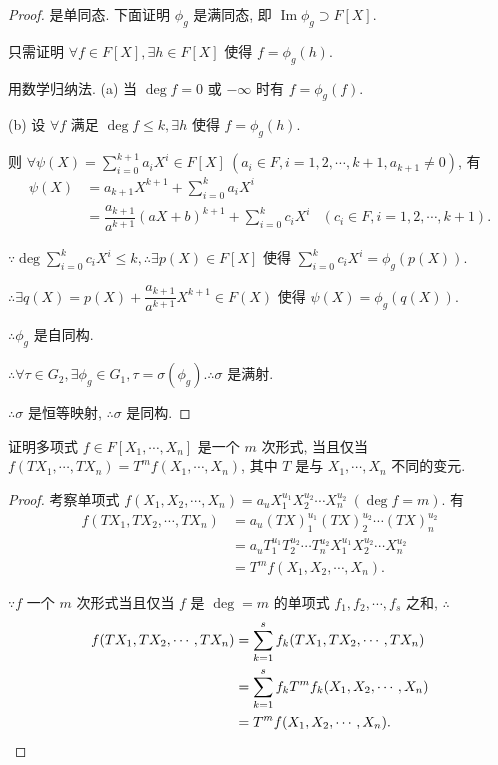 \documentclass[UTF8]{ctexart}
\begin{document}
\begin{proof}
    是单同态. 下面证明 $\phi_g$ 是满同态, 即 $\operatorname{Im}\phi_g\supset F[X]$.

    只需证明 $\forall f\in F[X],\exists h\in F[X]$ 使得 $f=\phi_g(h)$.

    用数学归纳法. (a) 当 $\deg f=0$ 或 $-\infty$ 时有 $f=\phi_g(f)$.

    (b) 设 $\forall f$ 满足 $\deg f\leq k,\exists h$ 使得 $f=\phi_g(h)$.

    则 $\forall\psi(X)=\sum\limits_{i=0}^{k+1}a_iX^i\in F[X]\ (a_i\in F,i=1,2,\cdots,k+1,a_{k+1}\neq0)$, 有
    \begin{align*}
        \psi(X) & =a_{k+1}X^{k+1}+\sum\limits_{i=0}^{k}a_iX^i \\
        & =\dfrac{a_{k+1}}{a^{k+1}}(aX+b)^{k+1}+\sum\limits_{i=0}^{k}c_iX^i & (c_i\in F,i=1,2,\cdots,k+1).
    \end{align*}

    $\because\deg\sum\limits_{i=0}^{k}c_iX^i\leq k,\therefore\exists p(X)\in F[X]$ 使得 $\sum\limits_{i=0}^{k}c_iX^i=\phi_g(p(X))$.

    $\therefore\exists q(X)=p(X)+\dfrac{a_{k+1}}{a^{k+1}}X^{k+1}\in F(X)$ 使得 $\psi(X)=\phi_g(q(X))$.

    $\therefore\phi_g$ 是自同构.

    $\therefore\forall\tau\in G_2,\exists\phi_g\in G_1,\tau=\sigma(\phi_g).\therefore\sigma$ 是满射.

    $\therefore\sigma$ 是恒等映射, $\therefore\sigma$ 是同构.
\end{proof}
\begin{exercise}
    证明多项式 $f\in F[X_1,\cdots,X_n]$ 是一个 $m$ 次形式, 当且仅当 $f(TX_1,\cdots,TX_n)=T^mf(X_1,\cdots,X_n)$, 其中 $T$ 是与 $X_1,\cdots,X_n$ 不同的变元.
\end{exercise}
\begin{proof}
    考察单项式 $f(X_1,X_2,\cdots,X_n)=a_uX^{u_1}_1X^{u_2}_2\cdots X^{u_2}_n\ (\deg f=m)$. 有
    \begin{align*}
        f(TX_1,TX_2,\cdots,TX_n) & =a_u(TX)^{u_1}_1(TX)^{u_2}_2\cdots (TX)^{u_2}_n \\
        & =a_uT^{u_1}_1T^{u_2}_2\cdots T^{u_2}_nX^{u_1}_1X^{u_2}_2\cdots X^{u_2}_n \\
        & =T^mf(X_1,X_2,\cdots,X_n).
    \end{align*}

    $\because f$ 一个 $m$ 次形式当且仅当 $f$ 是 $\deg=m$ 的单项式 $f_1,f_2,\cdots,f_s$ 之和, $\therefore$
    \begin{align*}
        f(TX_1,TX_2,\cdots,TX_n) & =\sum\limits_{k=1}^sf_k(TX_1,TX_2,\cdots,TX_n) \\
        & =\sum\limits_{k=1}^sf_kT^mf_k(X_1,X_2,\cdots,X_n) \\
        & =T^mf(X_1,X_2,\cdots,X_n).\qedhere
    \end{align*}
\end{proof}
\end{document}
